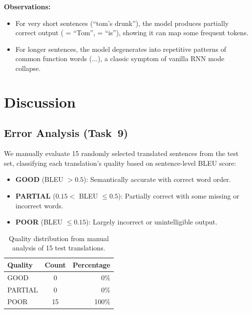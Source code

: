 \documentclass[runningheads]{llncs}
\begin{document}
\textbf{Observations:}
\begin{itemize}
    \item For very short sentences (``tom's drunk''), the model produces partially correct output ( = ``Tom'',  = ``is''), showing it can map some frequent tokens.
    \item For longer sentences, the model degenerates into repetitive patterns of common function words (...), a classic symptom of vanilla RNN mode collapse.
\end{itemize}

\section{Discussion}\label{sec:discussion}

\subsection{Error Analysis (Task~9)}

We manually evaluate 15 randomly selected translated sentences from the test set, classifying each translation's quality based on sentence-level BLEU score:
\begin{itemize}
    \item \textbf{GOOD} (BLEU $> 0.5$): Semantically accurate with correct word order.
    \item \textbf{PARTIAL} ($0.15 < $ BLEU $\le 0.5$): Partially correct with some missing or incorrect words.
    \item \textbf{POOR} (BLEU $\le 0.15$): Largely incorrect or unintelligible output.
\end{itemize}

\begin{table}[H]
\centering
\caption{Quality distribution from manual analysis of 15 test translations.}
\label{tab:quality}
\begin{tabular}{@{}lcr@{}}
\toprule
\textbf{Quality} & \textbf{Count} & \textbf{Percentage} \\
\midrule
GOOD    & 0  & 0\% \\
PARTIAL & 0  & 0\% \\
POOR    & 15 & 100\% \\
\bottomrule
\end{tabular}
\end{table}
\end{document}

